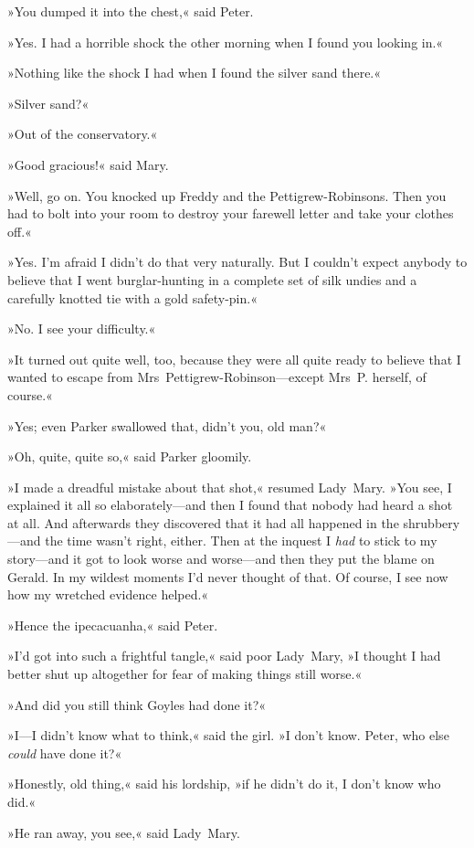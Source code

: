 »You dumped it into the chest,« said Peter.

»Yes. I had a horrible shock the other morning when I found you looking in.«

»Nothing like the shock I had when I found the silver sand there.«

»Silver sand?«

»Out of the conservatory.«

»Good gracious!« said Mary.

»Well, go on. You knocked up Freddy and the Pettigrew-Robinsons. Then you had to bolt into your room to destroy your farewell letter and take your clothes off.«

»Yes. I'm afraid I didn't do that very naturally. But I couldn't expect anybody to believe that I went burglar-hunting in a complete set of silk undies and a carefully knotted tie with a gold safety-pin.«

»No. I see your difficulty.«

»It turned out quite well, too, because they were all quite ready to believe that I wanted to escape from Mrs~Pettigrew-Robinson—except Mrs~P. herself, of course.«

»Yes; even Parker swallowed that, didn't you, old man?«

»Oh, quite, quite so,« said Parker gloomily.

»I made a dreadful mistake about that shot,« resumed Lady~Mary. »You see, I explained it all so elaborately—and then I found that nobody had heard a shot at all. And afterwards they discovered that it had all happened in the shrubbery—and the time wasn't right, either. Then at the inquest I \textit{had} to stick to my story—and it got to look worse and worse—and then they put the blame on Gerald. In my wildest moments I'd never thought of that. Of course, I see now how my wretched evidence helped.«

»Hence the ipecacuanha,« said Peter.

»I'd got into such a frightful tangle,« said poor Lady~Mary, »I thought I had better shut up altogether for fear of making things still worse.«

»And did you still think Goyles had done it?«

»I—I didn't know what to think,« said the girl. »I don't know. Peter, who else \textit{could} have done it?«

»Honestly, old thing,« said his lordship, »if he didn't do it, I don't know who did.«

»He ran away, you see,« said Lady~Mary.


